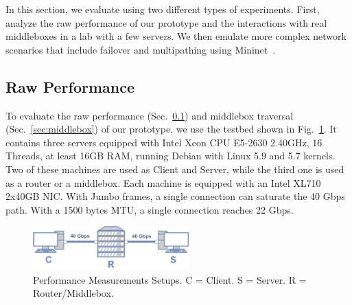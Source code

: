 
In this section, we evaluate \tcpls using two different types of experiments. First, analyze the raw performance of our \tcpls prototype and the interactions with real middleboxes in a lab with a few servers. We then emulate more complex network scenarios that include failover and multipathing using Mininet~\cite{handigol2012reproducible}.






\subsection{Raw Performance}
\label{sec:perf}

To evaluate the raw performance (Sec.~\ref{sec:perf}) and middlebox traversal
(Sec.~\ref{sec:middlebox}) of our \tcpls prototype, we use the testbed shown in Fig.~\ref{fig:perf_testbed}. It contains three servers equipped with Intel Xeon CPU E5-2630 2.40GHz, 16 Threads, at least 16GB RAM, running Debian with Linux 5.9 and 5.7 kernels. Two of these machines are used as Client and Server,
while the third one is used as a router or a middlebox. Each machine is equipped with an Intel XL710 2x40GB NIC. With Jumbo frames, a single \tcp connection can saturate the 40 Gbps path. With a 1500 bytes MTU, a single connection reaches 22 Gbps.

\begin{figure}[!t]
  \begin{center}
    \includegraphics[width=6cm]{figures/testbed.png}
  \end{center}
  \vspace{-0.5cm}
  \caption{Performance Measurements Setups. C = Client. S = Server. R = Router/Middlebox.}
  \label{fig:perf_testbed}
\end{figure}


